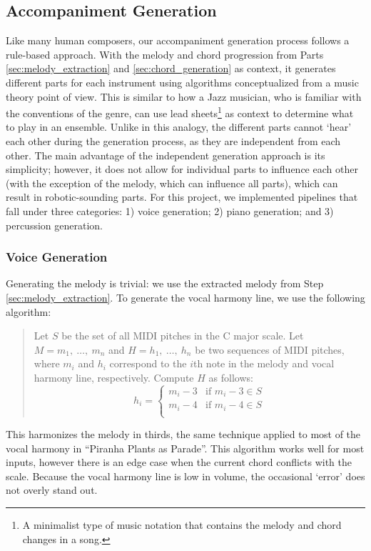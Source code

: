 \subsection{Accompaniment Generation}
\label{sec:accompaniment_generation}

Like many human composers, our accompaniment generation process follows a rule-based approach. With the melody and chord progression from Parts \ref{sec:melody_extraction} and \ref{sec:chord_generation} as context, it generates different parts for each instrument using algorithms conceptualized from a music theory point of view. This is similar to how a Jazz musician, who is familiar with the conventions of the genre, can use lead sheets\footnote{A minimalist type of music notation that contains the melody and chord changes in a song.} as context to determine what to play in an ensemble. Unlike in this analogy, the different parts cannot `hear' each other during the generation process, as they are independent from each other. The main advantage of the independent generation approach is its simplicity; however, it does not allow for individual parts to influence each other (with the exception of the melody, which can influence all parts), which can result in robotic-sounding parts. For this project, we implemented pipelines that fall under three categories: 1) voice generation; 2) piano generation; and 3) percussion generation.

\subsubsection{Voice Generation}

Generating the melody is trivial: we use the extracted melody from Step \ref{sec:melody_extraction}. To generate the vocal harmony line, we use the following algorithm:
\begin{quote}
    Let $S$ be the set of all MIDI pitches in the C major scale.
    Let $M = m_1, \ \ldots, \ m_n$ and $H = h_1, \ \ldots, \ h_n$ be two sequences of MIDI pitches, where $m_i$ and $h_i$ correspond to the $i$th note in the melody and vocal harmony line, respectively.
    Compute $H$ as follows:
    $$h_i = \begin{cases}
        m_i - 3 & \text{if }m_i - 3 \in S \\
        m_i - 4 & \text{if }m_i - 4 \in S \\
    \end{cases}$$
\end{quote}
This harmonizes the melody in thirds, the same technique applied to most of the vocal harmony in ``Piranha Plants as Parade''. This algorithm works well for most inputs, however there is an edge case when the current chord conflicts with the scale. Because the vocal harmony line is low in volume, the occasional `error' does not overly stand out.

